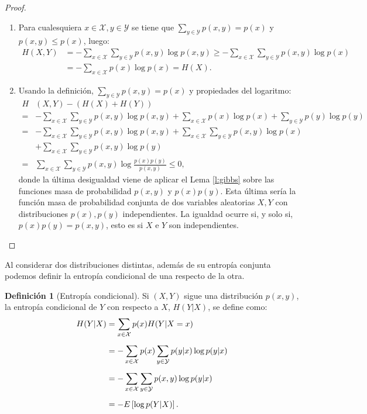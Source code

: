 \documentclass[12pt,a4paper]{report} %
\theoremstyle{definition}
\newtheorem{definition}{Definición}[section]
\begin{document}
\begin{proof}\hfill
  \begin{enumerate}
  \item Para cualesquiera $x \in \mathcal{X}, y \in \mathcal{Y}$ se tiene que $\sum_{y \in \mathcal{Y}} p(x,y) = p(x)$ y $p(x,y) \le p(x)$, luego:
\begin{align*}
  H(X,Y) &= - \sum_{x \in \mathcal{X}} \sum_{y \in \mathcal{Y}} p(x,y) \log p(x,y) \ge - \sum_{x \in \mathcal{X}} \sum_{y \in \mathcal{Y}} p(x,y) \log p(x)\\
   &= - \sum_{x \in \mathcal{X}} p(x) \log p(x) = H(X).
\end{align*}

\item Usando la definición, $\sum_{y \in \mathcal{Y}} p(x,y) = p(x)$ y propiedades del logaritmo:
  \begin{align*}
    H&(X,Y) - (H(X) + H(Y)) \\[5pt] =& - \sum_{x \in \mathcal{X}} \sum_{y \in \mathcal{Y}} p(x,y) \log p(x,y) + \sum_{x \in \mathcal{X}} p(x)\log p(x) + \sum_{y \in \mathcal{Y}} p(y)\log p(y)\\[5pt]
    = &- \sum_{x \in \mathcal{X}} \sum_{y \in \mathcal{Y}} p(x,y) \log p(x,y) + \sum_{x \in \mathcal{X}} \sum_{y \in \mathcal{Y}} p(x,y)\log p(x)\\ &+ \sum_{x \in \mathcal{X}} \sum_{y \in \mathcal{Y}} p(x,y)\log p(y)\\[3pt]
    = &\sum_{x \in \mathcal{X}} \sum_{y \in \mathcal{Y}} p(x,y) \log \frac{p(x)p(y)}{p(x,y)} \leq 0,
  \end{align*}
  donde la última desigualdad viene de aplicar el Lema \ref{l:gibbs} sobre las funciones masa de probabilidad $p(x,y)$ y $p(x)p(y)$. Esta última sería la función masa de probabilidad conjunta de dos variables aleatorias $X,Y$ con distribuciones $p(x), p(y)$ independientes. La igualdad ocurre si, y solo si, $p(x)p(y) = p(x,y)$, esto es si $X$ e $Y$ son independientes.
  \end{enumerate}
\end{proof}

Al considerar dos distribuciones distintas, además de su entropía conjunta podemos definir la entropía condicional de una respecto de la otra.\\

\begin{definition}[Entropía condicional]
  Si $(X,Y)$ sigue una distribución $p(x,y)$, la entropía condicional de $Y$ con respecto a $X$, $H(Y|X)$, se define como:
  \begin{align*}
    H(Y|X) &= \sum_{x \in \mathcal{X}} p(x) H(Y | X = x)\\[5pt]
    &= - \sum_{x \in \mathcal{X}} p(x) \sum_{y \in \mathcal{Y}} p(y | x) \log p(y | x)\\[5pt]
    &=  - \sum_{x \in \mathcal{X}} \sum_{y \in \mathcal{Y}} p(x,y) \log p(y | x)\\[5pt]
    &=- \relax{E}\left[ \log p(Y|X)\right].
  \end{align*}
\end{definition}
\end{document}
